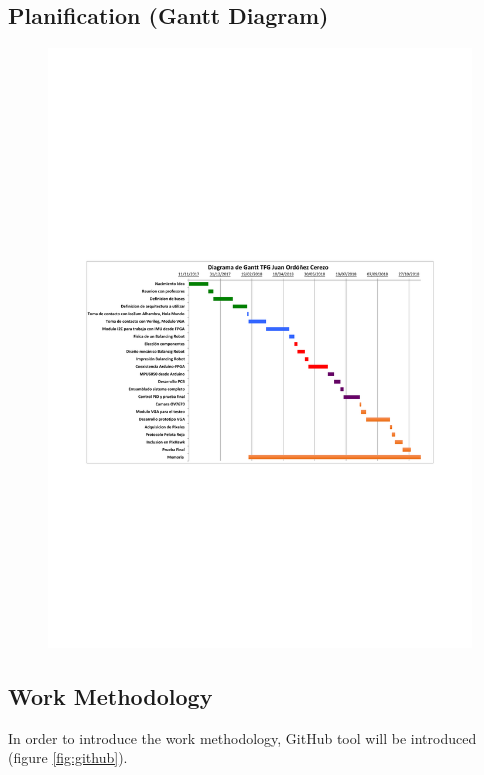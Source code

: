 \subsection{Planification (Gantt Diagram)}

\begin{center}
	\begin{figure}[H]
		\center
		\includegraphics[trim = 15mm 85mm 2cm 100mm,clip, angle=-90, scale = 1]{imagenes/Introduction/Gantt.pdf}
		\label{fig:diagramaGantt}
		\caption{}
	\end{figure}
\end{center}

\subsection{Work Methodology}
In order to introduce the work methodology, GitHub tool will be introduced\cite{Git} (figure \ref{fig:github}).\newline 

